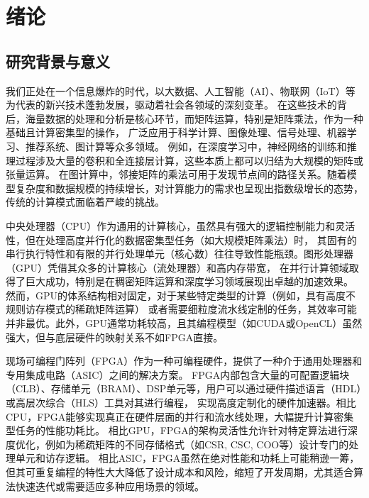 \chapter{绪论}

\section{研究背景与意义}

我们正处在一个信息爆炸的时代，以大数据、人工智能（AI）、物联网（IoT）等为代表的新兴技术蓬勃发展，驱动着社会各领域的深刻变革\cite{lecun2015deep}。
在这些技术的背后，海量数据的处理和分析是核心环节，而矩阵运算，特别是矩阵乘法，作为一种基础且计算密集型的操作，
广泛应用于科学计算、图像处理、信号处理、机器学习、推荐系统、图计算等众多领域\cite{golub2013matrix}。
例如，在深度学习中，神经网络的训练和推理过程涉及大量的卷积和全连接层计算，这些本质上都可以归结为大规模的矩阵或张量运算\cite{chetlur2014cudnn}。
在图计算中，邻接矩阵的乘法可用于发现节点间的路径关系\cite{kepner2011graph}。随着模型复杂度和数据规模的持续增长，对计算能力的需求也呈现出指数级增长的态势，传统的计算模式面临着严峻的挑战。

中央处理器（CPU）作为通用的计算核心，虽然具有强大的逻辑控制能力和灵活性，但在处理高度并行化的数据密集型任务（如大规模矩阵乘法）时，
其固有的串行执行特性和有限的并行处理单元（核心数）往往导致性能瓶颈\cite{hennessy2011computer}。图形处理器（GPU）凭借其众多的计算核心（流处理器）和高内存带宽，
在并行计算领域取得了巨大成功，特别是在稠密矩阵运算和深度学习领域展现出卓越的加速效果\cite{owens2008gpu}。
然而，GPU的体系结构相对固定，对于某些特定类型的计算（例如，具有高度不规则访存模式的稀疏矩阵运算）
或者需要细粒度流水线定制的任务，其效率可能并非最优\cite{bell2009implementing}。此外，GPU通常功耗较高，且其编程模型（如CUDA或OpenCL）虽然强大，但与底层硬件的映射关系不如FPGA直接。

现场可编程门阵列（FPGA）作为一种可编程硬件，提供了一种介于通用处理器和专用集成电路（ASIC）之间的解决方案\cite{xilinx2025ultrascale}。
FPGA内部包含大量的可配置逻辑块（CLB）、存储单元（BRAM）、DSP单元等，用户可以通过硬件描述语言（HDL）或高层次综合（HLS）工具对其进行编程，
实现高度定制化的硬件加速器\cite{nane2015survey}。相比CPU，FPGA能够实现真正在硬件层面的并行和流水线处理，大幅提升计算密集型任务的性能功耗比。
相比GPU，FPGA的架构灵活性允许针对特定算法进行深度优化，例如为稀疏矩阵的不同存储格式（如CSR, CSC, COO等）设计专门的处理单元和访存逻辑\cite{zhuo2005sparse}。
相比ASIC，FPGA虽然在绝对性能和功耗上可能稍逊一筹，但其可重复编程的特性大大降低了设计成本和风险，缩短了开发周期，尤其适合算法快速迭代或需要适应多种应用场景的领域。

